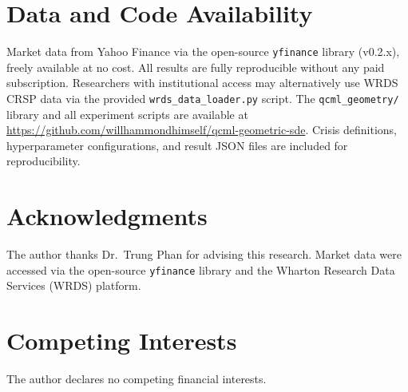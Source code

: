 \documentclass[3p]{elsarticle}
\begin{document}
\section*{Data and Code Availability}

Market data from Yahoo Finance via the open-source \texttt{yfinance}
library (v0.2.x), freely available at no cost.  All results are fully
reproducible without any paid subscription.  Researchers with
institutional access may alternatively use WRDS CRSP data via the
provided \texttt{wrds\_data\_loader.py} script.  The
\texttt{qcml\_geometry/} library and all experiment scripts are
available at \url{https://github.com/willhammondhimself/qcml-geometric-sde}.  Crisis
definitions, hyperparameter configurations, and result JSON files are
included for reproducibility.

\section*{Acknowledgments}

The author thanks Dr.\ Trung Phan for advising this research.
Market data were accessed via the open-source \texttt{yfinance}
library and the Wharton Research Data Services (WRDS) platform.

\section*{Competing Interests}

The author declares no competing financial interests.




\appendix
\end{document}
